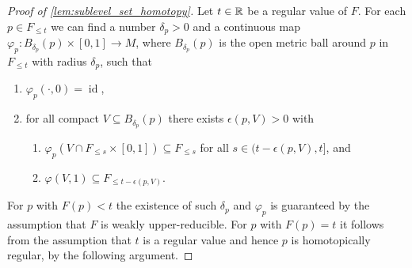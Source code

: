 \begin{proof}[Proof of \cref{lem:sublevel_set_homotopy}]
	Let $t \in \mathbb{R}$ be a regular value of $F$.
	For each $p \in F_{\leq t}$ we can find a number $\delta_{p} > 0$ and a continuous map $\varphi_{p} \colon B_{\delta_{p}}(p) \times [0,1] \to M$, where $B_{\delta_{p}}(p)$ is the open metric ball around $p$ in $F_{\leq t}$ with radius $\delta_{p}$, such that
	\begin{enumerate}
		\item $\varphi_{p}(\cdot,0) = \operatorname{id}$,
		\item for all compact $V \subseteq B_{\delta_{p}}(p)$ there exists $\epsilon(p,V) > 0$ with
		\begin{enumerate}
			\item $\varphi_{p}(V \cap F_{\leq s}\times [0,1]) \subseteq F_{\leq s}$ for all $s \in (t - \epsilon(p,V), t]$, and
			\item $\varphi(V,1) \subseteq F_{\leq t - \epsilon(p,V)}$.
		\end{enumerate}
	\end{enumerate}
	For $p$ with $F(p) < t$ the existence of such $\delta_{p}$ and $\varphi_{p}$ is guaranteed by the assumption that $F$ is weakly upper-reducible.
	For $p$ with $F(p) = t$ it follows from the assumption that $t$ is a regular value and hence $p$ is homotopically regular, by the following argument.
	

\end{proof}
